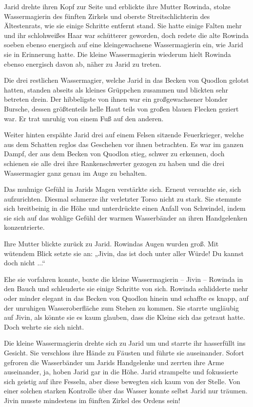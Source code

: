 Jarid drehte ihren Kopf zur Seite und erblickte ihre Mutter Rowinda, stolze Wassermagierin des fünften Zirkels und oberste Streitschlichterin des Ältestenrats, wie sie einige Schritte entfernt stand. Sie hatte einige Falten mehr und ihr schlohweißes Haar war schütterer geworden, doch redete die alte Rowinda soeben ebenso energisch auf eine kleingewachsene Wassermagierin ein, wie Jarid sie in Erinnerung hatte. Die kleine Wassermagierin wiederum hielt Rowinda ebenso energisch davon ab, näher zu Jarid zu treten.

Die drei restlichen Wassermagier, welche Jarid in das Becken von Quodlon gelotst hatten, standen abseits als kleines Grüppchen zusammen und blickten sehr betreten drein. Der hibbeligste von ihnen war ein großgewachsener blonder Bursche, dessen größtenteils helle Haut teils von großen blauen Flecken geziert war. Er trat unruhig von einem Fuß auf den anderen.

Weiter hinten erspähte Jarid drei auf einem Felsen sitzende Feuerkrieger, welche aus dem Schatten reglos das Geschehen vor ihnen betrachten. Es war im ganzen Dampf, der aus dem Becken von Quodlon stieg, schwer zu erkennen, doch schienen sie alle drei ihre Rankenschwerter gezogen zu haben und die drei Wassermagier ganz genau im Auge zu behalten.

Das mulmige Gefühl in Jarids Magen verstärkte sich. Erneut versuchte sie, sich aufzurichten. Diesmal schmerze ihr verletzter Torso nicht zu stark. Sie stemmte sich breitbeinig in die Höhe und unterdrückte einen Anfall von Schwindel, indem sie sich auf das wohlige Gefühl der warmen Wasserbänder an ihren Handgelenken konzentrierte.

Ihre Mutter blickte zurück zu Jarid. Rowindas Augen wurden groß. Mit wütendem Blick setzte sie an: „Jivin, das ist doch unter aller Würde! Du kannst doch nicht ...“

Ehe sie vorfahren konnte, boxte die kleine Wassermagierin – Jivin – Rowinda in den Bauch und schleuderte sie einige Schritte von sich. Rowinda schlidderte mehr oder minder elegant in das Becken von Quodlon hinein und schaffte es knapp, auf der unruhigen Wasseroberfläche zum Stehen zu kommen. Sie starrte ungläubig auf Jivin, als könnte sie es kaum glauben, dass die Kleine sich das getraut hatte. Doch wehrte sie sich nicht.

Die kleine Wassermagierin drehte sich zu Jarid um und starrte ihr hasserfüllt ins Gesicht. Sie verschloss ihre Hände zu Fäusten und führte sie auseinander. Sofort gefroren die Wasserbänder um Jarids Handgelenke und zerrten ihre Arme auseinander, ja, hoben Jarid gar in die Höhe. Jarid strampelte und fokussierte sich geistig auf ihre Fesseln, aber diese bewegten sich kaum von der Stelle. Von einer solchen starken Kontrolle über das Wasser konnte selbst Jarid nur träumen. Jivin musste mindestens im fünften Zirkel des Ordens sein!

